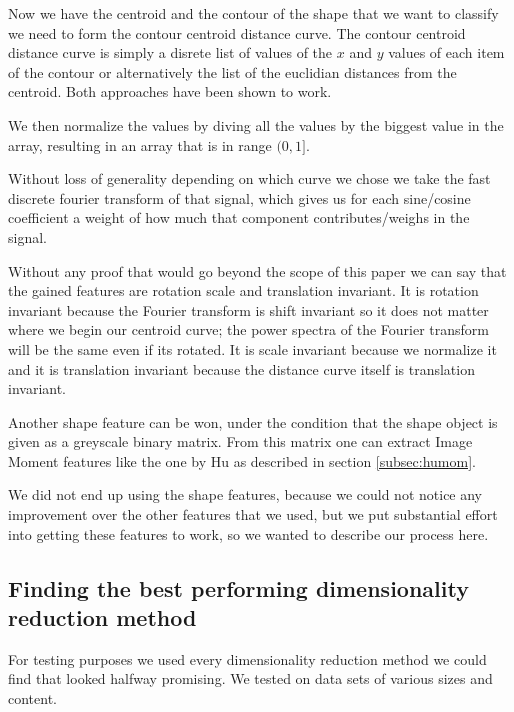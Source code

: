 \documentclass[journal]{vgtc}       %
\newcommand{\todo}[1]{\textcolor{red}{\textbf{TODO:} #1}}
\begin{document}
Now we have the centroid and the contour of the shape that we want to classify we need to form the contour centroid distance curve.
The contour centroid distance curve is simply a disrete list of values of the \(x\) and \(y\)  values of each item of the contour  or alternatively the list of the euclidian  distances from the centroid. Both approaches have been shown to work.

We then normalize the values by diving all the values by the biggest value in the array, resulting in an array that is in range $(0,1]$.

Without loss of generality depending on which curve we chose we take the fast discrete fourier transform of that signal, which gives us for each sine/cosine coefficient a weight of how much  that component contributes/weighs in the signal.

Without any proof that would go beyond the scope of this paper we can say that the gained features are rotation scale and translation invariant. It is rotation invariant because the Fourier transform is shift invariant so it does not matter where we begin our centroid curve; the power spectra of the Fourier transform will be the same even if its rotated. It is scale invariant because we normalize it and it is translation invariant because the distance curve itself is  translation invariant.

Another shape feature can be won, under the condition that the shape object is given as a greyscale binary matrix. From this matrix one can extract Image Moment features like the one by Hu as described in section \ref{subsec:humom}.

We did not end up using the shape features, because we could not notice any improvement over the other features that we used, but we put substantial effort into getting these features to work, so we wanted to describe our process here.




\subsection{Finding the best performing  dimensionality reduction method}\label{subsec:dimred}
For testing purposes we used every dimensionality reduction method we could find that looked halfway promising. We tested on data sets of various sizes and content.
\end{document}

